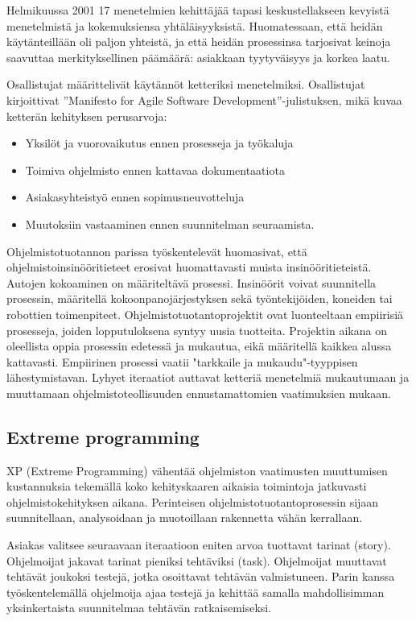 \documentclass[finnish]{tktltiki2}
\theoremstyle{definition}
\theoremstyle{remark}
\begin{document}
Helmikuussa 2001 17 menetelmien kehittäjää tapasi keskustellakseen kevyistä menetelmistä ja kokemuksiensa yhtäläisyyksistä. Huomatessaan, että heidän käytänteillään oli paljon yhteistä, ja että heidän prosessinsa tarjosivat keinoja saavuttaa merkityksellinen päämäärä: asiakkaan tyytyväisyys ja korkea laatu\cite{WIC03}. 

Osallistujat määrittelivät käytännöt ketteriksi menetelmiksi.
Osallistujat kirjoittivat ''Manifesto for Agile Software Development''-julistuksen, mikä kuvaa ketterän kehityksen perusarvoja:

\begin{itemize}
 \item Yksilöt ja vuorovaikutus ennen prosesseja ja työkaluja
 \item Toimiva ohjelmisto ennen kattavaa dokumentaatiota
 \item Asiakasyhteistyö ennen sopimusneuvotteluja
 \item Muutoksiin vastaaminen ennen suunnitelman seuraamista\cite{WIC03}.
\end{itemize}

Ohjelmistotuotannon parissa työskentelevät huomasivat, että ohjelmistoinsinööritieteet erosivat huomattavasti muista insinööritieteistä. Autojen kokoaminen on määriteltävä prosessi. Insinöörit voivat suunnitella prosessin, määritellä kokoonpanojärjestyksen sekä työntekijöiden, koneiden tai robottien toimenpiteet\cite{WIC03}. Ohjelmistotuotantoprojektit ovat luonteeltaan empiirisiä prosesseja, joiden lopputuloksena syntyy uusia tuotteita. Projektin aikana on oleellista oppia prosessin edetessä ja mukautua, eikä määritellä kaikkea alussa kattavasti. Empiirinen prosessi vaatii "tarkkaile ja mukaudu"-tyyppisen lähestymistavan. Lyhyet iteraatiot auttavat ketteriä menetelmiä mukautumaan ja muuttamaan ohjelmistoteollisuuden ennustamattomien vaatimuksien mukaan\cite{WIC03}.

\subsection{Extreme programming}

XP (Extreme Programming) vähentää ohjelmiston vaatimusten muuttumisen kustannuksia tekemällä koko kehityskaaren aikaisia toimintoja jatkuvasti ohjelmistokehityksen aikana. Perinteisen ohjelmistotuotantoprosessin sijaan suunnitellaan, analysoidaan ja muotoillaan rakennetta vähän kerrallaan\cite{BEC99}.

Asiakas valitsee seuraavaan iteraatioon eniten arvoa tuottavat tarinat (story). Ohjelmoijat jakavat tarinat pieniksi tehtäviksi (task). Ohjelmoijat muuttavat tehtävät joukoksi testejä, jotka osoittavat tehtävän valmistuneen. Parin kanssa työskentelemällä ohjelmoija ajaa testejä ja kehittää samalla mahdollisimman yksinkertaista suunnitelmaa tehtävän ratkaisemiseksi\cite{BEC99}.
\end{document}
